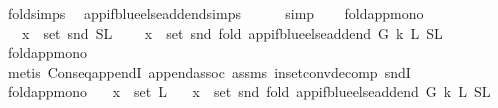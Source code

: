 \begin{isabellebody}
\ fold{\isacharunderscore}{\kern0pt}simps{\isacharparenleft}{\kern0pt}{}{\isacharparenright}{\kern0pt}\ \isamarkupfalse%
\ app{\isacharunderscore}{\kern0pt}if{\isacharunderscore}{\kern0pt}blue{\isacharunderscore}{\kern0pt}else{\isacharunderscore}{\kern0pt}add{\isacharunderscore}{\kern0pt}end{\isachardot}{\kern0pt}simps\isanewline
\ \ \ \ \isamarkupfalse%
\ simp\isanewline
{}\isamarkupfalse%
%
\endisatagproof
{\isafoldproof}%
%
\isadelimproof
\isanewline
%
\endisadelimproof
\ \ \isanewline
\isanewline
{}\isamarkupfalse%
\ fold{\isacharunderscore}{\kern0pt}app{\isacharunderscore}{\kern0pt}mono{}{\isacharcolon}{\kern0pt}\isanewline
\ \ \ {\isachardoublequoteopen}x\ {\isasymin}\ set\ {\isacharparenleft}{\kern0pt}snd\ {\isacharparenleft}{\kern0pt}S{\isacharcomma}{\kern0pt}L{}{\isacharparenright}{\kern0pt}{\isacharparenright}{\kern0pt}{\isachardoublequoteclose}\isanewline
\ \ \ {\isachardoublequoteopen}\ x\ {\isasymin}\ set\ {\isacharparenleft}{\kern0pt}snd\ {\isacharparenleft}{\kern0pt}fold\ {\isacharparenleft}{\kern0pt}app{\isacharunderscore}{\kern0pt}if{\isacharunderscore}{\kern0pt}blue{\isacharunderscore}{\kern0pt}else{\isacharunderscore}{\kern0pt}add{\isacharunderscore}{\kern0pt}end\ G\ k{\isacharparenright}{\kern0pt}\ L{}\ {\isacharparenleft}{\kern0pt}S{}{\isacharcomma}{\kern0pt}L{}{\isacharparenright}{\kern0pt}{\isacharparenright}{\kern0pt}{\isacharparenright}{\kern0pt}{\isachardoublequoteclose}\isanewline
%
\isadelimproof
\ \ %
\endisadelimproof
%
\isatagproof
{}\isamarkupfalse%
\ fold{\isacharunderscore}{\kern0pt}app{\isacharunderscore}{\kern0pt}mono\isanewline
\ \ \isamarkupfalse%
\ {\isacharparenleft}{\kern0pt}metis\ Cons{\isacharunderscore}{\kern0pt}eq{\isacharunderscore}{\kern0pt}appendI\ append{\isachardot}{\kern0pt}assoc\ assms\ in{\isacharunderscore}{\kern0pt}set{\isacharunderscore}{\kern0pt}conv{\isacharunderscore}{\kern0pt}decomp\ sndI{\isacharparenright}{\kern0pt}%
\endisatagproof
{\isafoldproof}%
%
\isadelimproof
\ \isanewline
%
\endisadelimproof
\isanewline
{}\isamarkupfalse%
\ fold{\isacharunderscore}{\kern0pt}app{\isacharunderscore}{\kern0pt}mono{}{\isacharcolon}{\kern0pt}\isanewline
\ \ \ {\isachardoublequoteopen}x\ {\isasymin}\ set\ L{}{\isachardoublequoteclose}\isanewline
\ \ \ {\isachardoublequoteopen}x\ {\isasymin}\ set\ {\isacharparenleft}{\kern0pt}snd\ {\isacharparenleft}{\kern0pt}fold\ {\isacharparenleft}{\kern0pt}app{\isacharunderscore}{\kern0pt}if{\isacharunderscore}{\kern0pt}blue{\isacharunderscore}{\kern0pt}else{\isacharunderscore}{\kern0pt}add{\isacharunderscore}{\kern0pt}end\ G\ k{\isacharparenright}{\kern0pt}\ L{}\ {\isacharparenleft}{\kern0pt}S{\isacharcomma}{\kern0pt}L{}{\isacharparenright}{\kern0pt}{\isacharparenright}{\kern0pt}{\isacharparenright}{\kern0pt}{\isachardoublequoteclose}\ \isanewline

\end{isabellebody}
